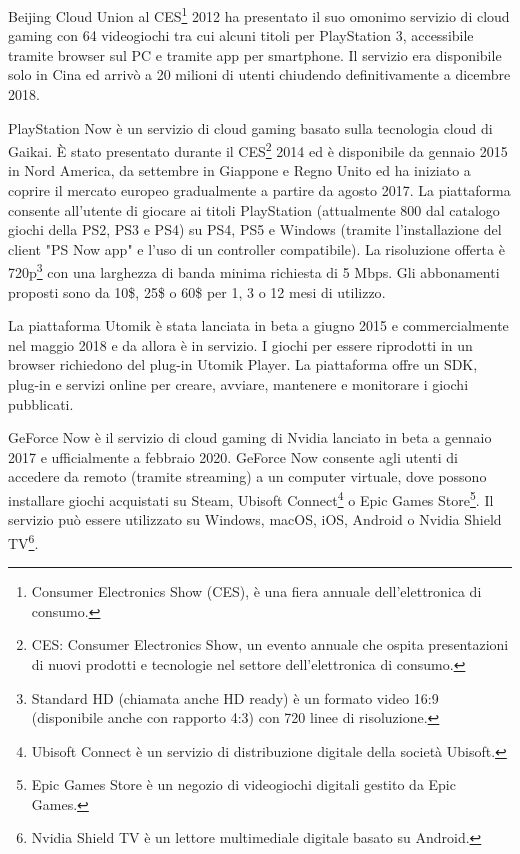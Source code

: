 Beijing Cloud Union al CES\footnote{Consumer Electronics Show (CES), è una fiera annuale dell'elettronica di consumo.} 2012 ha presentato il suo omonimo servizio di cloud gaming con 64 videogiochi tra cui alcuni titoli per PlayStation 3, accessibile tramite browser sul PC e tramite app per smartphone. Il servizio era disponibile solo in Cina ed arrivò a 20 milioni di utenti chiudendo definitivamente a dicembre 2018\cite{CloudUnion}.

PlayStation Now è un servizio di cloud gaming basato sulla tecnologia cloud di Gaikai. È stato presentato durante il CES\footnote{CES: Consumer Electronics Show, un evento annuale che ospita presentazioni di nuovi prodotti e tecnologie nel settore dell'elettronica di consumo.} 2014 ed è disponibile da gennaio 2015 in Nord America, da settembre in Giappone e Regno Unito ed ha iniziato a coprire il mercato europeo gradualmente a partire da agosto 2017. La piattaforma consente all'utente di giocare ai titoli PlayStation (attualmente 800 dal catalogo giochi della PS2, PS3 e PS4) su PS4, PS5 e Windows (tramite l'installazione del client "PS Now app" e l'uso di un controller compatibile). La risoluzione offerta è 720p\footnote{Standard HD (chiamata anche HD ready) è un formato video 16:9 (disponibile anche con rapporto 4:3) con 720 linee di risoluzione.} con una larghezza di banda minima richiesta di 5 Mbps. Gli abbonamenti proposti sono da 10\$, 25\$ o 60\$ per 1, 3 o 12 mesi di utilizzo\cite{PlayStation_Now}.

La piattaforma Utomik è stata lanciata in beta a giugno 2015 e commercialmente nel maggio 2018 e da allora è in servizio. I giochi per essere riprodotti in un browser richiedono del plug-in Utomik Player. La piattaforma offre un SDK, plug-in e servizi online per creare, avviare, mantenere e monitorare i giochi pubblicati\cite{Utomik}.

GeForce Now è il servizio di cloud gaming di Nvidia lanciato in beta a gennaio 2017 e ufficialmente a febbraio 2020. GeForce Now consente agli utenti di accedere da remoto (tramite streaming) a un computer virtuale, dove possono installare giochi acquistati su Steam, Ubisoft Connect\footnote{Ubisoft Connect è un servizio di distribuzione digitale della società Ubisoft.} o Epic Games Store\footnote{Epic Games Store è un negozio di videogiochi digitali gestito da Epic Games.}. Il servizio può essere utilizzato su Windows, macOS, iOS, Android o Nvidia Shield TV\footnote{Nvidia Shield TV è un lettore multimediale digitale basato su Android.}\cite{GeForce_Now}.

